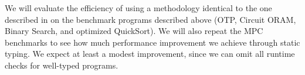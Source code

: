 We will evaluate the efficiency of \lang using a methodology identical to the one described in  on the
benchmark programs described above (OTP, Circuit ORAM, Binary Search, and optimized QuickSort). We will also repeat the MPC
benchmarks to see how much performance improvement we achieve through static typing. We expect at least a modest improvement,
since we can omit all runtime checks for well-typed programs.
